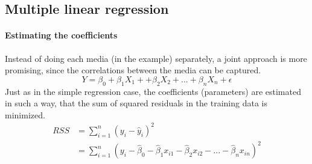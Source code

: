 \documentclass[../document.tex]{subfiles}
\begin{document}
	\subsection{Multiple linear regression}

	\paragraph{Estimating the coefficients}
	Instead of doing each media (in the example) separately, a joint approach is more promising, since the correlations between the media can be captured.
	\begin{equation}
		Y = \beta_{0}+\beta_{1}X_{1}++\beta_{2}X_{2}+...+\beta_{n}X_{n}+\epsilon
	\end{equation}
	Just as in the simple regression case, the coefficients (parameters) are estimated in such a way, that the sum of squared residuals in the training data is minimized.
	\begin{equation}
	\begin{split}
		RSS &= \sum_{i=1}^{n}(y_{i}-\hat{y}_{i})^2\\
			&= \sum_{i=1}^{n}(y_{i}-\hat{\beta}_{0}-\hat{\beta}_{1}x_{i1}-\hat{\beta}_{2}x_{i2}-...-\hat{\beta}_{n}x_{in})^2
	\end{split}
	\end{equation}
\end{document}
